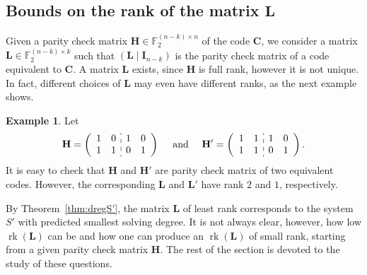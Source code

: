 \documentclass[11pt]{article}
\newcommand{\F}[0]{\mathbb{F}}
\theoremstyle{plain}
\theoremstyle{definition}
\newtheorem{ex}{Example}[section]
\theoremstyle{remark}
\begin{document}
\subsection{Bounds on the rank of the matrix $\mathbf{L}$}\label{sezL}
Given a parity check matrix $\mathbf{H}\in\F_2^{(n-k)\times n}$ of the code $\mathbf{C}$, we consider a matrix $\mathbf{L}\in\F_2^{(n-k)\times k}$ such that $(\mathbf{L}\mid \mathbf{I}_{n-k})$ is the parity check matrix of a code equivalent to $\mathbf{C}$. A matrix $\mathbf{L}$ exists, since $\mathbf{H}$ is full rank, however it is not unique. In fact, different choices of $\mathbf{L}$ may even have different ranks, as the next example shows. 
\begin{ex}

Let $$\mathbf{H}=\left(\begin{array}{c c : c c}
        1 & 0 & 1 & 0 \\
        1 & 1 & 0 & 1
    \end{array}\right)\quad \mbox{ and }\quad
    \mathbf{H'}=\left(\begin{array}{c c : c c}
        1 & 1 & 1 & 0 \\
        1 & 1 & 0 & 1
    \end{array}\right).$$
It is easy to check that $\mathbf{H}$ and $\mathbf{H'}$ are parity check matrix of two equivalent codes. However, the corresponding $\mathbf{L}$ and $\mathbf{L'}$ have rank $2$ and $1$, respectively.
\end{ex}

By Theorem~\ref{thm:dregS'}, the matrix $\mathbf{L}$ of least rank corresponds to the system $S'$ with predicted smallest solving degree.
It is not always clear, however, how low $\operatorname{rk}(\mathbf{L})$ can be and how one can produce an $\operatorname{rk}(\mathbf{L})$ of small rank, starting from a given parity check matrix $\mathbf{H}$. The rest of the section is devoted to the study of these questions.
\end{document}
